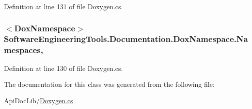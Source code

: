 Definition at line 131 of file Doxygen.\+cs.

\hypertarget{class_software_engineering_tools_1_1_documentation_1_1_dox_namespace_ae5b4d40bbeb72d6f0edb2e32702e9048}{
\subsubsection[{Namespaces}]{$<${\bf Dox\+Namespace}$>$ Software\+Engineering\+Tools.\+Documentation.\+Dox\+Namespace.\+Namespaces\hspace{0.3cm}{\ttfamily [get]}, {\ttfamily [set]}}}\label{class_software_engineering_tools_1_1_documentation_1_1_dox_namespace_ae5b4d40bbeb72d6f0edb2e32702e9048}


Definition at line 130 of file Doxygen.\+cs.



The documentation for this class was generated from the following file\+:\begin{DoxyCompactItemize}
\item 
Api\+Doc\+Lib/\hyperlink{_doxygen_8cs}{Doxygen.\+cs}\end{DoxyCompactItemize}
